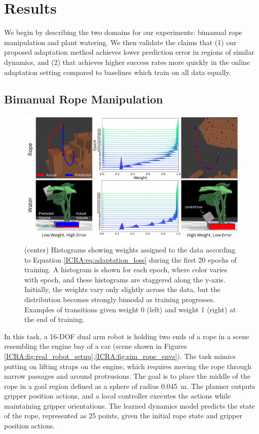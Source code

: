 \section{Results} \label{ICRA:sec:results}

We begin by describing the two domains for our experiments: bimanual rope manipulation and plant watering. We then validate the claims that (1) our proposed adaptation method achieves lower prediction error in regions of similar dynamics, and (2) that \FOCUS{} achieves higher success rates more quickly in the online adaptation setting compared to baselines which train on all data equally.

\subsection{Bimanual Rope Manipulation}
\label{ICRA:sec:rope}

\begin{figure}
    \centering
    \includegraphics[width=\linewidth]{Chap4/images/data_weight_distribution_figure.pdf}
    \caption{(center) Histograms showing weights assigned to the data according to Equation \eqref{ICRA:eq:adaptation_loss} during the first 20 epochs of training. A histogram is shown for each epoch, where color varies with epoch, and these histograms are staggered along the y-axis. Initially, the weights vary only slightly across the data, but the distribution becomes strongly bimodal as training progresses. Examples of transitions given weight 0 (left) and weight 1 (right) at the end of training.}
    \label{ICRA:fig:weights}
\end{figure}

In this task, a 16-DOF dual arm robot is holding two ends of a rope in a scene resembling the engine bay of a car (scene shown in Figures \ref{ICRA:fig:real_robot_setup},\ref{ICRA:fig:sim_rope_envs}). The task mimics putting on lifting straps on the engine, which requires moving the rope through narrow passages and around protrusions. The goal is to place the middle of the rope in a goal region defined as a sphere of radius \SI{0.045}{\meter}. The planner outputs gripper position actions, and a local controller executes the actions while maintaining gripper orientations. The learned dynamics model predicts the state of the rope, represented as 25 points, given the initial rope state and gripper position actions.

